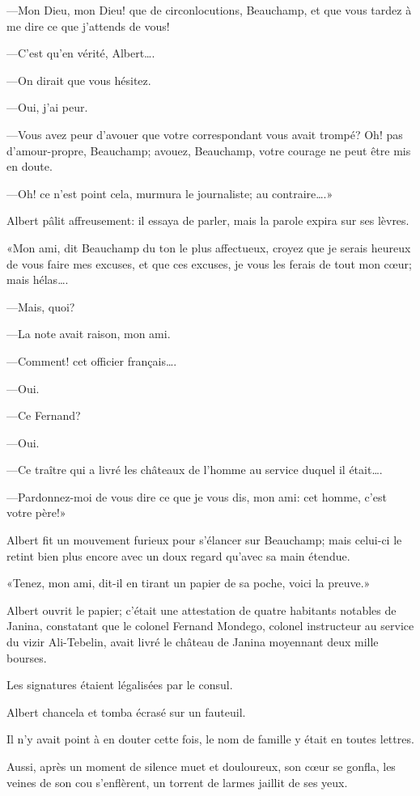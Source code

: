 —Mon Dieu, mon Dieu! que de circonlocutions, Beauchamp, et que vous tardez à me dire ce que j'attends de vous! 

—C'est qu'en vérité, Albert\dots. 

—On dirait que vous hésitez. 

—Oui, j'ai peur. 

—Vous avez peur d'avouer que votre correspondant vous avait trompé? Oh! pas d'amour-propre, Beauchamp; avouez, Beauchamp, votre courage ne peut être mis en doute. 

—Oh! ce n'est point cela, murmura le journaliste; au contraire\dots.» 

Albert pâlit affreusement: il essaya de parler, mais la parole expira sur ses lèvres. 

«Mon ami, dit Beauchamp du ton le plus affectueux, croyez que je serais heureux de vous faire mes excuses, et que ces excuses, je vous les ferais de tout mon cœur; mais hélas\dots. 

—Mais, quoi? 

—La note avait raison, mon ami. 

—Comment! cet officier français\dots. 

—Oui. 

—Ce Fernand? 

—Oui. 

—Ce traître qui a livré les châteaux de l'homme au service duquel il était\dots. 

—Pardonnez-moi de vous dire ce que je vous dis, mon ami: cet homme, c'est votre père!» 

Albert fit un mouvement furieux pour s'élancer sur Beauchamp; mais celui-ci le retint bien plus encore avec un doux regard qu'avec sa main étendue. 

«Tenez, mon ami, dit-il en tirant un papier de sa poche, voici la preuve.» 

Albert ouvrit le papier; c'était une attestation de quatre habitants notables de Janina, constatant que le colonel Fernand Mondego, colonel instructeur au service du vizir Ali-Tebelin, avait livré le château de Janina moyennant deux mille bourses. 

Les signatures étaient légalisées par le consul. 

Albert chancela et tomba écrasé sur un fauteuil. 

Il n'y avait point à en douter cette fois, le nom de famille y était en toutes lettres. 

Aussi, après un moment de silence muet et douloureux, son cœur se gonfla, les veines de son cou s'enflèrent, un torrent de larmes jaillit de ses yeux. 

